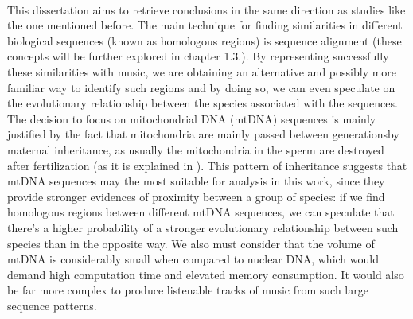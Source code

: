 \documentclass[11pt,twoside,a4paper]{report}
\begin{document}
\paragraph{} This dissertation aims to retrieve conclusions in the same direction as studies like the one mentioned before. The main technique for finding similarities in different biological sequences (known as homologous regions) is sequence alignment  (these concepts will be further explored in chapter 1.3.). By representing successfully these similarities with music, we are obtaining an alternative and possibly more familiar way to identify such regions and by doing so, we can even speculate on the evolutionary relationship between the species associated with the sequences.\\
The decision to focus on mitochondrial DNA (mtDNA) sequences is mainly justified by the fact that mitochondria are mainly passed between generationsby maternal inheritance, as usually the mitochondria in the sperm are destroyed after fertilization (as it is explained in \cite{mitochondria_inherit}). This pattern of inheritance suggests that mtDNA sequences may the most suitable for analysis in this work, since they provide stronger evidences of proximity between a group of species: if we find homologous regions between different mtDNA sequences, we can speculate that there's a higher probability of a stronger evolutionary relationship between such species than in the opposite way. We also must consider that the volume of mtDNA is considerably small when compared to nuclear DNA, which would demand high computation time and elevated memory consumption. It would also be far more complex to produce listenable tracks of music from such large sequence patterns. 
\end{document}
